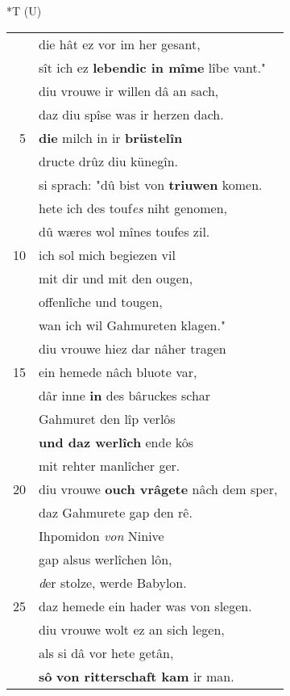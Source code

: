 \documentclass[8pt,a4paper,notitlepage]{article}
\begin{document}
\begin{table}[ht]
\begin{minipage}[t]{0.5\linewidth}
\end{minipage}
\hspace{0.5cm}
\begin{minipage}[t]{0.5\linewidth}
\small
\begin{center}*T (U)
\end{center}
\begin{tabular}{rl}
 & die hât ez vor im her gesant,\\ 
 & sît ich ez \textbf{lebendic in mîme} lîbe vant."\\ 
 & diu vrouwe ir willen dâ an sach,\\ 
 & daz diu spîse was ir herzen dach.\\ 
5 & \textbf{die} milch in ir \textbf{brüstelîn}\\ 
 & dructe drûz diu künegîn.\\ 
 & si sprach: "dû bist von \textbf{triuwen} komen.\\ 
 & hete ich des touf\textit{es} niht genomen,\\ 
 & dû wæres wol mînes toufes zil.\\ 
10 & ich sol mich begiezen vil\\ 
 & mit dir und mit den ougen,\\ 
 & offenlîche und tougen,\\ 
 & wan ich wil Gahmureten klagen."\\ 
 & diu vrouwe hiez dar nâher tragen\\ 
15 & ein hemede nâch bluote var,\\ 
 & dâr inne \textbf{in} des bâruckes schar\\ 
 & Gahmuret den lîp verlôs\\ 
 & \textbf{und daz werlîch} ende kôs\\ 
 & mit rehter manlîcher ger.\\ 
20 & diu vrouwe \textbf{ouch vrâgete} nâch dem sper,\\ 
 & daz Gahmurete gap den rê.\\ 
 & Ihpomidon \textit{von} Ninive\\ 
 & gap alsus werlîchen lôn,\\ 
 & \textit{d}er stolze, werde Babylon.\\ 
25 & daz hemede ein hader was von slegen.\\ 
 & diu vrouwe wolt ez an sich legen,\\ 
 & als si dâ vor hete getân,\\ 
 & \textbf{sô} \textbf{von ritterschaft kam} ir man.\\ 

\end{tabular}
\end{minipage}
\end{table}
\end{document}
